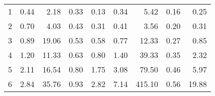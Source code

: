 \begin{tabular}{lrrrrrrrr}
\toprule
1 & 0.44 &  2.18 & 0.33 & 0.13 & 0.34 &   5.42 & 0.16 &  0.25 \\
2 & 0.70 &  4.03 & 0.43 & 0.31 & 0.41 &   3.56 & 0.20 &  0.31 \\
3 & 0.89 & 19.06 & 0.53 & 0.58 & 0.77 &  12.33 & 0.27 &  0.85 \\
4 & 1.20 & 11.33 & 0.63 & 0.80 & 1.40 &  39.33 & 0.35 &  2.32 \\
5 & 2.11 & 16.54 & 0.80 & 1.75 & 3.08 &  79.50 & 0.46 &  5.97 \\
6 & 2.84 & 35.76 & 0.93 & 2.82 & 7.14 & 415.10 & 0.56 & 19.88 \\
\bottomrule
\end{tabular}
